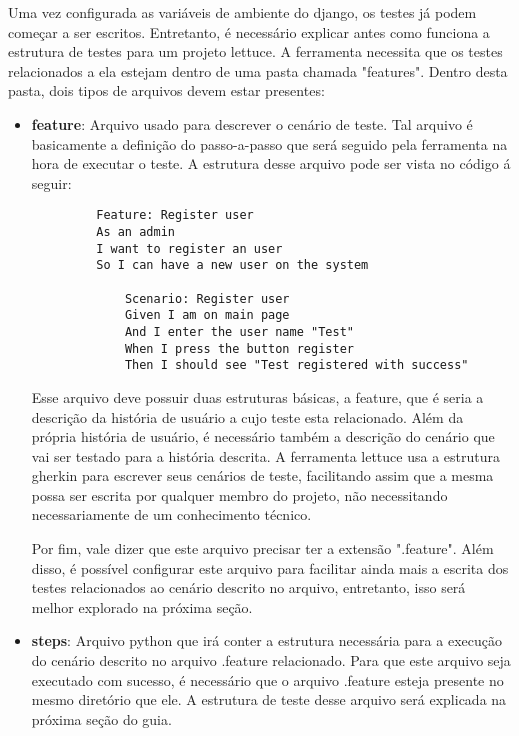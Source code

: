     Uma vez configurada as variáveis de ambiente do django, os testes já podem
    começar a ser escritos. Entretanto, é necessário explicar antes como
    funciona a estrutura de testes para um projeto lettuce. A ferramenta
    necessita que os testes relacionados a ela estejam dentro de uma pasta
    chamada "features". Dentro desta pasta, dois tipos de arquivos devem estar
    presentes:


    \begin{itemize}
         \item \textbf{feature}: Arquivo usado para descrever o cenário de
             teste. Tal arquivo é basicamente a definição do passo-a-passo que
             será seguido pela ferramenta na hora de executar o teste. A
             estrutura desse arquivo pode ser vista no código á seguir:


	     \begin{verbatim}
	     Feature: Register user
   	     As an admin
         I want to register an user
	     So I can have a new user on the system

             Scenario: Register user
             Given I am on main page
             And I enter the user name "Test"
             When I press the button register
             Then I should see "Test registered with success"
	     \end{verbatim}	

	     Esse arquivo deve possuir duas estruturas básicas, a feature, que é seria a descrição
	     da história de usuário a cujo teste esta relacionado. Além da própria
	     história de usuário, é necessário também a descrição do cenário que
	     vai ser testado para a história descrita. A ferramenta lettuce usa a
	     estrutura gherkin para escrever seus cenários de teste, facilitando
	     assim que a mesma possa ser escrita por qualquer membro do projeto, não
	     necessitando necessariamente de um conhecimento técnico.

         Por fim, vale dizer que este arquivo precisar ter a extensão
         ".feature". Além disso, é possível configurar este arquivo para
         facilitar ainda mais a escrita dos testes relacionados ao cenário
         descrito no arquivo, entretanto, isso será melhor explorado na próxima
         seção.

        \item \textbf{steps}: Arquivo python que irá conter a estrutura
            necessária para a execução do cenário descrito no arquivo .feature
            relacionado. Para que este arquivo seja executado com sucesso, é
            necessário que o arquivo .feature esteja presente no mesmo diretório
            que ele. A estrutura de teste desse arquivo será explicada na
            próxima seção do guia.

     \end{itemize}

